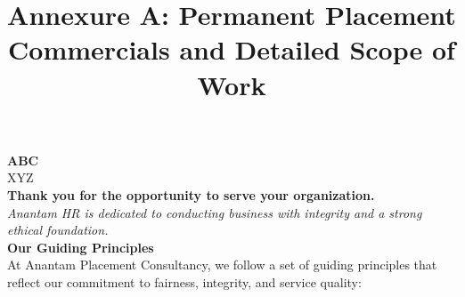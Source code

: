 \documentclass{article}
\title{\textbf{\color{primary} Annexure A: Permanent Placement Commercials and Detailed Scope of Work}}
\date{}
\begin{document}
\maketitle

\noindent\textbf{ABC}\\
XYZ\\[1em]

\noindent\textbf{Thank you for the opportunity to serve your organization.}\\[0.5em]
\noindent\textit{Anantam HR is dedicated to conducting business with integrity and a strong ethical foundation.}\\[1em]

\noindent\textbf{\color{secondary} Our Guiding Principles}\\[0.5em]
\noindent At Anantam Placement Consultancy, we follow a set of guiding principles that reflect our commitment to fairness, integrity, and service quality:
\end{document}

